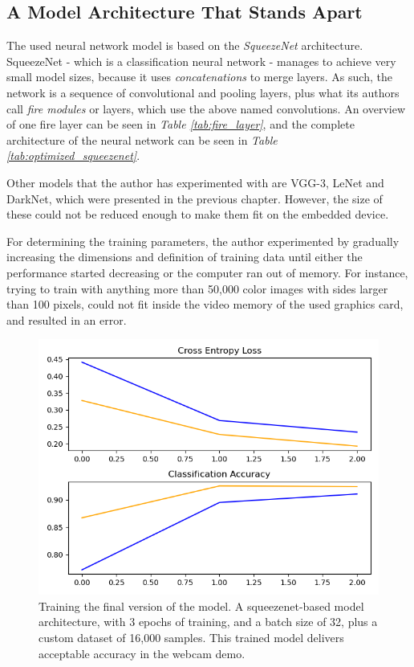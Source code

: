 \subsection{A Model Architecture That Stands Apart}
The used neural network model is based on the \textit{SqueezeNet} architecture. SqueezeNet - which is a classification neural network - manages to achieve very small model sizes, because it uses \textit{concatenations} to merge layers. As such, the network is a sequence of convolutional and pooling layers, plus what its authors call \textit{fire modules} or layers, which use the above named convolutions. An overview of one fire layer can be seen in \textit{Table \ref{tab:fire_layer}}, and the complete architecture of the neural network can be seen in \textit{Table \ref{tab:optimized_squeezenet}}. \par

Other models that the author has experimented with are VGG-3, LeNet and DarkNet, which were presented in the previous chapter. However, the size of these could not be reduced enough to make them fit on the embedded device. \par 
For determining the training parameters, the author experimented by gradually increasing the dimensions and definition of training data until either the performance started decreasing or the computer ran out of memory. For instance, trying to train with anything more than 50,000 color images with sides larger than 100 pixels, could not fit inside the video memory of the used graphics card, and resulted in an error.
\begin{figure}
    \centering
    \includegraphics[height = 10 cm]{images/squeezenet_3epochs.png}
    \caption{Training the final version of the model. A squeezenet-based model architecture, with 3 epochs of training, and a batch size of 32, plus a custom dataset of 16,000 samples. This trained model delivers acceptable accuracy in the webcam demo.}
    \label{fig:squeezenet_final_3_epochs}
\end{figure}

